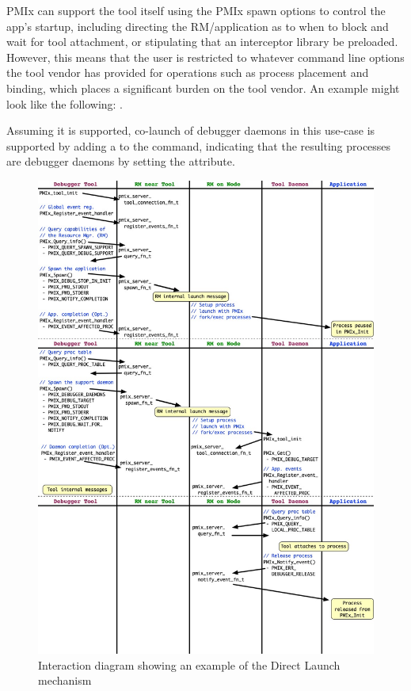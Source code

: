PMIx can support the tool itself using the PMIx spawn options to control the app’s startup, including directing the RM/application as to when to block and wait for tool attachment, or stipulating that an interceptor library be preloaded. However, this means that the user is restricted to whatever command line options the tool vendor has provided for operations such as process placement and binding, which places a significant burden on the tool vendor. An example might look like the following: .

Assuming it is supported, co-launch of debugger daemons in this use-case is supported by adding a  to the  command, indicating that the resulting processes are debugger daemons by setting the  attribute.

\begingroup
\begin{figure}
  \begin{center}
    \includegraphics[width=\textwidth,height=\textheight,keepaspectratio]{figs/direct-launch}
  \end{center}
  \caption{Interaction diagram showing an example of the Direct Launch mechanism}
  \label{fig:direct_launch}
\end{figure}
\endgroup


